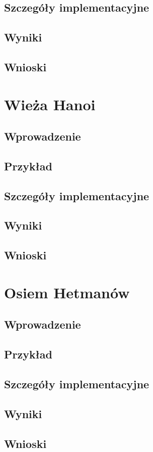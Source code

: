     \subsection{Szczegóły implementacyjne}
    \subsection{Wyniki}
    \subsection{Wnioski}
\section{Wieża Hanoi}
    \subsection{Wprowadzenie}
    \subsection{Przykład}
    \subsection{Szczegóły implementacyjne}
    \subsection{Wyniki}
    \subsection{Wnioski}
\section{Osiem Hetmanów}
\label{OsiemHetmanowTest}
    \subsection{Wprowadzenie}
    \subsection{Przykład}
    \subsection{Szczegóły implementacyjne}
    \subsection{Wyniki}
    \subsection{Wnioski}